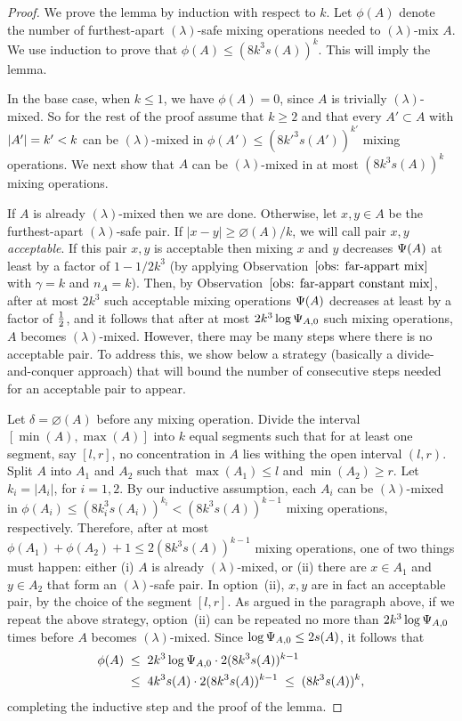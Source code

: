 \begin{proof}	
	We prove the lemma by induction with respect to $k$.
	Let $\phi(A)$ denote the number of furthest-apart $(\lambda)$-safe mixing operations needed to $(\lambda)$-mix $A$. We
	use induction to prove that $\phi(A) \le (8k^3s(A))^k$. This will imply the lemma.

	In the base case, when $k\le 1$, we have $\phi(A) = 0$, since $A$ is trivially $(\lambda)$-mixed.
	So for the rest of the proof assume that $k\ge 2$ and that every $A' \subset A$
	with ${|A'|} = k'<k$ can be $(\lambda)$-mixed in $\phi(A')\leq(8{k'}^3s(A'))^{k'}$ mixing operations.
	We next show that $A$ can be $(\lambda)$-mixed in at most $(8k^3s(A))^k$ mixing operations.
	
	If $A$ is already $(\lambda)$-mixed then we are done.
	Otherwise, let $x,y\in A$ be the furthest-apart $(\lambda)$-safe pair. 
	If $|x-y|\geq \diameter(A)/k$, we will call pair $x,y$ \emph{acceptable}.
	If this pair $x,y$ is acceptable then mixing $x$ and $y$ decreases 
	${\Psi}(A)$ at least by a factor of $1-1/2k^3$ (by applying 
	Observation~$\ref{obs: far-appart mix}$ with $\gamma = k$ and $n_A = k$).	
	Then, by Observation~$\ref{obs: far-appart constant mix}$, after at most $2k^3$ 
	such acceptable mixing operations ${\Psi}(A)$ decreases at least by a factor of ${\textstyle\frac{1}{2}}$, and
	it follows that after at most $2k^3\log{{\Psi}_{A,0}}$ such mixing operations, $A$ becomes $(\lambda)$-mixed.
	However, there may be many steps where there is no acceptable pair.
	To address this, we show below a strategy (basically a divide-and-conquer approach)
	that will bound the number of consecutive steps
	needed for an acceptable pair to appear.
	
	Let $\delta=\diameter(A)$ before any mixing operation.
	Divide the interval $[\min(A), \max(A)]$ into $k$ equal segments 
	such that for at least one segment, say $[l,r]$, no concentration in $A$ lies withing
	the open interval $(l,r)$.
	Split $A$ into $A_1$ and $A_2$ such that $\max(A_1) \leq l$ and $\min(A_2) \geq r$.
	Let $k_i = |A_i|$, for $i=1,2$.
	By our inductive assumption, each $A_i$ can be $(\lambda)$-mixed in
	$\phi(A_i) \le  (8k_i^3s(A_i))^{k_i} < (8k^3s(A))^{k-1}$ mixing operations, respectively.
	Therefore, after at most $\phi(A_1) + \phi(A_2)+1 \le 2(8k^3s(A))^{k-1}$
	mixing operations, one of two things must happen:
	either (i) $A$ is already $(\lambda)$-mixed, or
	(ii) there are $x\in A_1$ and $y\in A_2$ that form an $(\lambda)$-safe pair.
	In option~(ii), $x,y$ are in fact an acceptable pair, by the choice of the segment $[l,r]$.
	As argued in the paragraph above, if we repeat the above strategy, 
	option~(ii) can be repeated no more than $2k^3\log{{\Psi}_{A,0}}$
	times before $A$ becomes $(\lambda)$-mixed. Since $\log{{\Psi}_{A,0}} \le 2s(A)$,
	it follows that
	\begin{align*}
			\phi(A)
			\;&\leq\; 2k^3\log{\Psi}_{A,0} \cdot 2(8k^3s(A))^{k-1}
			\\
			&\leq\; 4k^3s(A)\cdot 2(8k^3s(A))^{k-1}
			\;\leq\; (8k^3s(A))^k,
	\end{align*}
	completing the inductive step and the proof of the lemma.
\end{proof}

